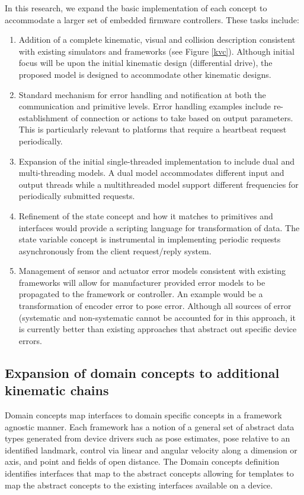 In this research, we expand the basic implementation of each concept to accommodate a larger set of embedded firmware controllers.  These tasks include: 
\begin{enumerate}
\item Addition of a complete kinematic, visual and collision description consistent with existing simulators and frameworks (see Figure \ref{kvc}).  Although initial focus will be upon the initial kinematic design (differential drive), the proposed model is designed to accommodate other kinematic designs.
\item Standard mechanism for error handling and notification at both the communication and primitive levels.  Error handling examples include re-establishment of connection or actions to take based on output parameters.  This is particularly relevant to platforms that require a heartbeat request periodically.
\item Expansion of the initial single-threaded implementation to include dual and multi-threading models.  A dual model accommodates different input and output threads while a multithreaded model support different frequencies for periodically submitted requests. 
\item Refinement of the state concept and how it matches to primitives and interfaces would provide a scripting language for transformation of data.  The state variable concept is instrumental in implementing periodic requests asynchronously from the client request/reply system.
\item Management of sensor and actuator error models consistent with existing frameworks will allow for manufacturer provided error models to be propagated to the framework or controller.  An example would be a transformation of encoder error to pose error.  Although all sources of error (systematic and non-systematic cannot be accounted for in this approach, it is currently better than existing approaches that abstract out specific device errors.
\end{enumerate}


\subsection{Expansion of domain concepts to additional kinematic chains}
Domain concepts map interfaces to domain specific concepts in a framework agnostic manner.  Each framework has a notion of a general set of abstract data types generated from device drivers such as pose estimates, pose relative to an identified landmark, control via linear and angular velocity along a dimension or axis, and point and fields of open distance.  The {\sc Domain concepts} definition identifies interfaces that map to the abstract concepts allowing for templates to map the abstract concepts to the existing interfaces available on a device.  

